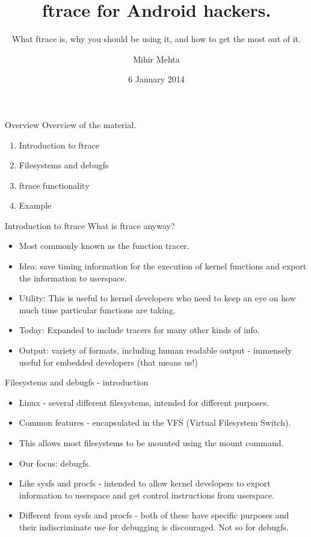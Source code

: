 \documentclass{beamer}
\title{ftrace for Android hackers.}
\subtitle{What ftrace is, why you should be using it, and how to get
  the most out of it.}
\author{Mihir Mehta}
\institute{
  Kernel Team\\
  Systems Core Group\\
  SRI Noida \\
  \texttt{mihir.mehta@samsung.com}
}
\date{6 January 2014}
\begin{document}
\begin{frame}[plain]
  \titlepage
\end{frame}

\begin{frame}{Overview}
  Overview of the material.
  \begin{enumerate}
  \item Introduction to ftrace
  \item Filesystems and debugfs
  \item ftrace functionality
  \item Example
  \end{enumerate}
\end{frame}

\begin{frame}{Introduction to ftrace}
  What is ftrace anyway?
  \begin{itemize}
  \item Most commonly known as the function tracer.
  \item Idea: save timing information for the execution of kernel
    functions and export the information to userspace.
  \item Utility: This is useful to kernel developers who need to keep
    an eye on how much time particular functions are taking.
  \item Today: Expanded to include tracers for many other kinds of
    info.
  \item Output: variety of formats, including human readable output -
    immensely useful for embedded developers (that means us!)
  \end{itemize}
\end{frame}

\begin{frame}{Filesystems and debugfs - introduction}
  \begin{itemize}
  \item Linux - several different filesystems, intended for different
    purposes.
  \item Common features - encapsulated in the VFS (Virtual
    Filesystem Switch).
  \item This allows most filesystems to be mounted using the mount
    command.
  \item Our focus: debugfs.
  \item Like sysfs and procfs - intended to allow kernel developers
    to export information to userspace and get control
    instructions from userspace.
  \item Different from sysfs and procfs - both of these have
    specific purposes and their indiscriminate use for debugging is
    discouraged. Not so for debugfs.
  \end{itemize}
\end{frame}
\end{document}
